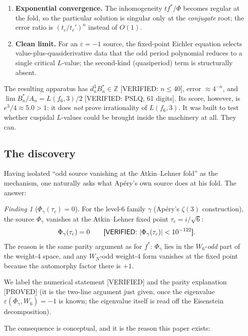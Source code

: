 \documentclass[11pt,reqno]{amsart}
\theoremstyle{plain}
\theoremstyle{definition}
\theoremstyle{remark}
\newtheorem{finding}[theorem]{Finding}
\newcommand{\Z}{\mathbb{Z}}
\newcommand{\eps}{\varepsilon}
\newcommand{\dn}{d_n}
\newcommand{\tc}{t_c}
\newcommand{\tcp}{t_c'}
\newcommand{\Proved}{\textup{\textsf{[PROVED]}}}
\newcommand{\Verified}{\textup{\textsf{[VERIFIED]}}}
\newcommand{\VerifiedR}[1]{\textup{\textsf{[VERIFIED: #1]}}}
\begin{document}
\begin{enumerate}[label=(\roman*),leftmargin=2em]
\item \textbf{Exponential convergence.} The inhomogeneity
  $t f^{*}/\Phi$ becomes regular at the fold, so the particular solution
  is singular only at the \emph{conjugate} root; the error ratio is
  $(\tc/\tcp)^n$ instead of $O(1)$.
\item \textbf{Clean limit.} For an $\eps=-1$ source, the fixed-point
  Eichler equation selects value-plus-quasiderivative data that the odd
  period polynomial reduces to a single critical $L$-value; the
  second-kind (quasiperiod) term is structurally absent.
\end{enumerate}

The resulting apparatus has $\dn^3B^{*}_n\in\Z$ \VerifiedR{$n\le40$},
error $\approx 4^{-n}$, and
$\lim B^{*}_n/A_n = L(f_6,3)/2$ \VerifiedR{PSLQ, 61 digits}. Its score,
however, is $e^3/4\approx 5.0>1$: it does \emph{not} prove irrationality
of $L(f_6,3)$. It was built to test whether cuspidal $L$-values could be
brought inside the machinery at all. They can.

\subsection{The discovery}

Having isolated ``odd source vanishing at the Atkin--Lehner fold'' as the
mechanism, one naturally asks what Ap\'ery's own source does at his fold.
The answer:

\begin{finding}[$\Phi_\gamma(\tau_c)=0$]
\label{find:phi}
For the level-$6$ family $\gamma$ (Ap\'ery's $\zeta(3)$ construction), the
source $\Phi_\gamma$ vanishes at the Atkin--Lehner fixed point
$\tau_c = i/\sqrt6$: \[\Phi_\gamma(\tau_c)=0\qquad
\VerifiedR{$|\Phi_\gamma(\tau_c)|<10^{-122}$}.\]
The reason is the same parity argument as for $f^{*}$: $\Phi_\gamma$ lies
in the $W_6$-\emph{odd} part of the weight-$4$ space, and any $W_N$-odd
weight-$4$ form vanishes at the fixed point because the automorphy factor
there is $+1$.
\end{finding}

We label the numerical statement \Verified{} and the parity explanation
\Proved{} (it is the two-line argument just given, once the eigenvalue
$\eps(\Phi_\gamma,W_6)=-1$ is known; the eigenvalue itself is read off
the Eisenstein decomposition).

The consequence is conceptual, and it is the reason this paper exists:
\end{document}
